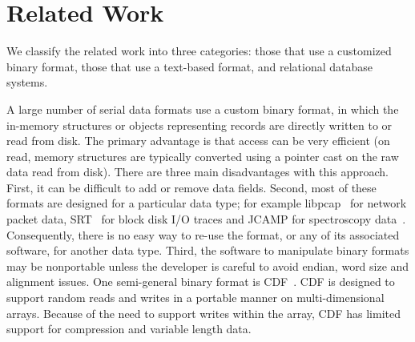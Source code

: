 \section{Related Work}\label{sec:related}

We classify the related work into three categories:
those that use a customized binary format, those that use a
text-based format, and relational database systems. 


A large number of serial data formats use a custom binary format, 
in which the in-memory
structures or objects representing records are directly written to or
read from disk. The primary advantage is that access can be very efficient
(on read, memory structures are typically converted using a
pointer cast on the raw data read from disk). 
There are three main disadvantages with this approach.  First, it can be
difficult to add or remove data fields.
Second, most of
these formats are designed for a particular data type; for example
libpcap~\cite{libpcap} for network packet data, SRT~\cite{SRT} for
block disk I/O traces and JCAMP for spectroscopy data~\cite{JCAMP}.
Consequently, there is no easy way to re-use the format, or any
of its associated software, for another data type.
Third, the software to manipulate binary formats may be nonportable
unless the developer is careful to avoid endian, word size and
alignment issues.  One semi-general binary format is CDF~\cite{CDF}.
CDF is designed to support random reads and writes in a portable
manner on multi-dimensional arrays.  Because of the need to support
writes within the array, CDF has limited support for compression and
variable length data.

